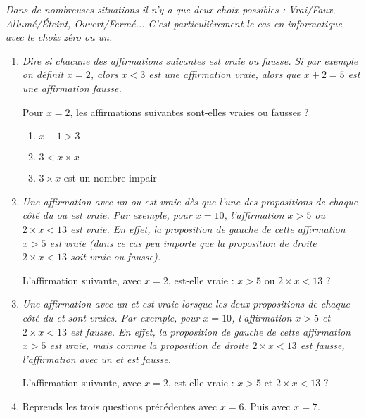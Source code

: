 \documentclass[class=report,crop=false, 12pt]{standalone}
\begin{document}


\emph{Dans de nombreuses situations il n'y a que deux choix possibles : Vrai/Faux, Allumé/Éteint, Ouvert\slash Fermé... C'est particulièrement le cas en informatique avec le choix zéro ou un.}

\bigskip
\bigskip


\begin{activite}
\sauteligne
\begin{enumerate}
  \item \emph{Dire si chacune des affirmations suivantes est vraie ou fausse. Si par exemple on définit $x = 2$, alors \og $x < 3$ \fg{} est une affirmation vraie, alors que \og $x + 2 = 5$ \fg{} est une affirmation fausse.}
 
  Pour $x=2$, les affirmations suivantes sont-elles vraies ou fausses ?
  \begin{enumerate}
    \item \og $x - 1 > 3$ \fg{}
    \item \og $3 < x \times x$ \fg{}
    \item \og $3 \times x$ est un nombre impair \fg{}
  \end{enumerate}  
  
  \item \emph{Une affirmation avec un \og ou \fg{} est vraie dès que l'une des propositions de chaque côté du \og ou \fg{} est vraie. Par exemple, pour $x=10$, l'affirmation  
\og $x > 5$ ou $2 \times x < 13$ \fg{} est vraie. En effet, la proposition de gauche de cette affirmation \og $x>5$ \fg{} est vraie (dans ce cas peu importe que la proposition de droite  \og $2 \times x < 13$ \fg{} soit vraie ou fausse).}
  
  L'affirmation suivante, avec $x=2$, est-elle vraie : \og $x > 5$ ou $2 \times x < 13$ \fg{}  ?

  
  \item \emph{Une affirmation avec un \og et \fg{} est vraie lorsque les deux propositions de chaque côté du \og et \fg{} sont vraies. Par exemple, pour $x=10$, l'affirmation  
\og $x > 5$ et $2 \times x < 13$ \fg{} est fausse. En effet, la proposition de gauche de cette affirmation \og $x>5$ \fg{} est vraie, mais comme la proposition de droite  \og $2 \times x < 13$ \fg{} est fausse, l'affirmation avec un \og et \fg{} est fausse.}
  
  L'affirmation suivante, avec $x=2$, est-elle vraie : \og $x > 5$ et $2 \times x < 13$ \fg{} ?
  
  \item Reprends les trois questions précédentes avec $x = 6$. Puis avec $x = 7$.
  

\end{enumerate}
\end{activite}
\end{document}
